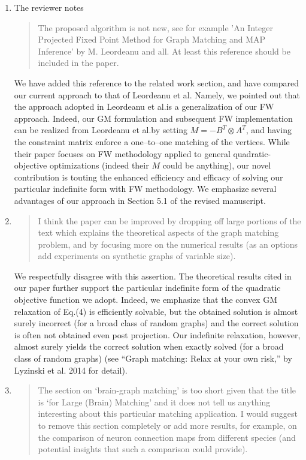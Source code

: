 \documentclass[10pt]{article}
\begin{document}
\begin{enumerate}
    \item The reviewer notes
    \begin{quote}
      The proposed algorithm is not new, see for example 'An Integer Projected Fixed Point Method for Graph Matching and MAP Inference' by M. Leordeanu and all. At least this reference should be included in the paper. 
    \end{quote}
We have added this reference to the related work section, and have compared our current approach to that of Leordeanu et al. Namely, we pointed out that the approach adopted in Leordeanu et al.\@ is a generalization of our FW approach.  Indeed, our GM formulation and subsequent FW implementation can be realized from Leordeanu et al.\@ by setting $M=-B^T\otimes A^T$, and having the constraint matrix enforce a one--to--one matching of the vertices.  While their paper focuses on FW methodology applied to general quadratic-objective optimizations (indeed their $M$ could be anything), our novel contribution is touting the enhanced efficiency and efficacy of solving our particular indefinite form with FW methodology.  We emphasize several advantages of our approach in Section 5.1 of the revised manuscript.
\item\begin{quote}
I think the paper can be improved by dropping off large portions of the text which explains the theoretical aspects of the graph matching problem, and by focusing more on the numerical results (as an options add experiments on synthetic graphs of variable size).
\end{quote}
We respectfully disagree with this assertion.  The theoretical results cited in our paper further support the particular indefinite form of the quadratic objective function we adopt.  Indeed, we emphasize that the convex GM relaxation of Eq.\@ (4) is efficiently solvable, but the obtained solution is almost surely incorrect (for a broad class of random graphs)
 and the correct solution is often not obtained even post projection.  Our indefinite relaxation, however, almost surely yields the correct solution when exactly solved (for a broad class of random graphs) (see ``Graph matching: Relax at your own risk,'' by Lyzinski et al. 2014 for detail).
 \item\begin{quote}
The section on `brain-graph matching' is too short given that the title is `for Large (Brain) Matching' and it does not tell us anything interesting about this particular matching application. I would suggest to remove this section completely or add more results, for example, on the comparison of neuron connection maps from different species (and potential insights that such a comparison could provide).

\end{quote}
\end{enumerate}
\end{document}
